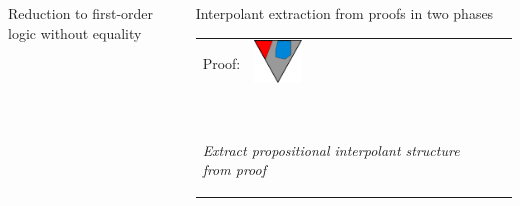 \documentclass[final,hyperref={pdfpagelabels=true}]{beamer}
\newcommand{\itemizeOnBlockStart}{
		\vspace*{-0.5em}
	}
\begin{document}
\begin{frame}
\begin{columns}[t]
\begin{column}{\mycolwidth}
\begin{block}{Reduction to first-order logic without equality \cite{Craig57linear}}
			\end{block}

		\end{column}
		\begin{column}{\mycolwidth}


			\begin{block}{Interpolant extraction from proofs in two phases \cite{Huang95}}


					\newcommand{\fakemulticolwidth}{0.28\textwidth}
					\begin{tabular}{p{}ll}

					Proof: 
					&

					\multicolumn{1}{m{\fakemulticolwidth}}{
						\includegraphics[width=0.2\textwidth]{figures/two_phase_draft_proof}
					}
					&
						\vspace*{0.5em}
					\\

					\multicolumn{2}{l}{
						\hspace*{10.35em}{$\Downarrow$} ~\parbox[c]{12em}{\emph{ Extract propositional interpolant structure from proof}}
						\vspace*{0.5em}
				}
				 \\
			 

\end{tabular}
\end{block}
\end{column}
\end{columns}
\end{frame}
\end{document}

